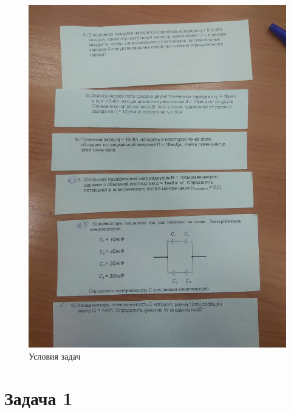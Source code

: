 \documentclass[12pt,a4paper]{article}  %
\begin{document}
	\begin{figure}[hpt!]
		\centering
	 	\includegraphics[width=1\linewidth]{photo/tasks_description}
	 	\caption{Условия задач}
	 	\label{tasks}
	\end{figure}

	\section*{Задача 1}
		
\end{document}
